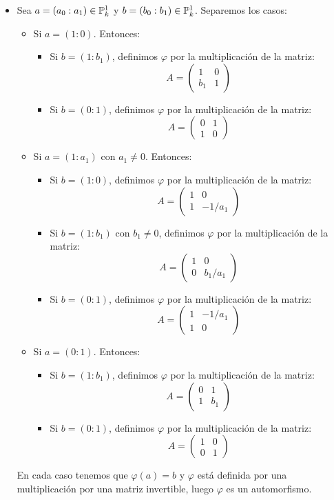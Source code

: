 \documentclass[twoside]{article}
\begin{document}
\begin{solucion}
\begin{itemize}
\item Sea $a=(a_0:a_1) \in \mathbb{P}_k^1$ y $b=(b_0:b_1) \in \mathbb{P}_k^1$. Separemos los casos:
\begin{itemize}
	\item Si $a=(1:0)$. Entonces:
	\begin{itemize}
		\item Si $b = (1:b_1)$, definimos $φ$ por la multiplicación de la matriz:
		\[ A = \begin{pmatrix}1 & 0\\b_1 & 1\end{pmatrix} \]
		\item Si $b = (0:1)$, definimos $φ$ por la multiplicación de la matriz:
		\[ A = \begin{pmatrix}0 & 1\\1 & 0\end{pmatrix} \]
	\end{itemize}
	\item Si $a=(1:a_1)$ con $a_1 \neq 0$. Entonces:
	\begin{itemize}
		\item Si $b = (1:0)$, definimos $φ$ por la multiplicación de la matriz:
		\[ A = \begin{pmatrix}1 & 0\\1 & -1/a_1\end{pmatrix} \]
		\item Si $b = (1:b_1)$ con $b_1 \neq 0$, definimos $φ$ por la multiplicación de la matriz:
		\[ A = \begin{pmatrix}1 & 0\\0 & b_1/a_1\end{pmatrix} \]
		\item Si $b = (0:1)$, definimos $φ$ por la multiplicación de la matriz:
		\[ A = \begin{pmatrix}1 & -1/a_1\\1 & 0\end{pmatrix} \]
	\end{itemize}
	\item Si $a=(0:1)$. Entonces:
	\begin{itemize}
		\item Si $b = (1:b_1)$, definimos $φ$ por la multiplicación de la matriz:
		\[ A = \begin{pmatrix}0 & 1\\1 & b_1\end{pmatrix} \]
		\item Si $b = (0:1)$, definimos $φ$ por la multiplicación de la matriz:
		\[ A = \begin{pmatrix}1 & 0\\0 & 1\end{pmatrix} \]
	\end{itemize}
\end{itemize}
En cada caso tenemos que $φ(a) = b$ y $φ$ está definida por una multiplicación por una matriz invertible, luego $φ$ es un automorfismo.


\end{itemize}
\end{solucion}
\end{document}
